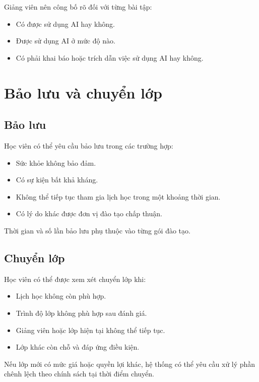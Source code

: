 \documentclass[12pt,a4paper]{article}
\begin{document}
Giảng viên nên công bố rõ đối với từng bài tập:

\begin{itemize}
    \item Có được sử dụng AI hay không.
    \item Được sử dụng AI ở mức độ nào.
    \item Có phải khai báo hoặc trích dẫn việc sử dụng AI hay không.
\end{itemize}

\section{Bảo lưu và chuyển lớp}

\subsection{Bảo lưu}

Học viên có thể yêu cầu bảo lưu trong các trường hợp:

\begin{itemize}
    \item Sức khỏe không bảo đảm.
    \item Có sự kiện bất khả kháng.
    \item Không thể tiếp tục tham gia lịch học trong một khoảng thời gian.
    \item Có lý do khác được đơn vị đào tạo chấp thuận.
\end{itemize}

Thời gian và số lần bảo lưu phụ thuộc vào từng gói đào tạo.

\subsection{Chuyển lớp}

Học viên có thể được xem xét chuyển lớp khi:

\begin{itemize}
    \item Lịch học không còn phù hợp.
    \item Trình độ lớp không phù hợp sau đánh giá.
    \item Giảng viên hoặc lớp hiện tại không thể tiếp tục.
    \item Lớp khác còn chỗ và đáp ứng điều kiện.
\end{itemize}

Nếu lớp mới có mức giá hoặc quyền lợi khác, hệ thống có thể yêu cầu
xử lý phần chênh lệch theo chính sách tại thời điểm chuyển.
\end{document}
